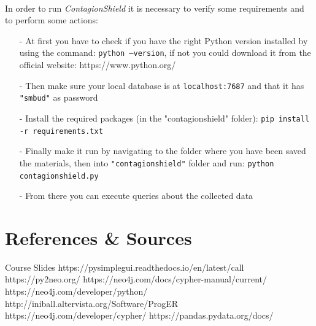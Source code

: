 \documentclass[a4paper,12pt]{article}
\begin{document}
\paragraph{}
In order to run \emph{ContagionShield} it is necessary to verify some requirements and to perform some actions:
\begin{itemize}[noitemsep]
   \item[-] At first you have to check if you have the right Python version installed by using the command: \texttt{python --version}, if not you could download it from the official website: https://www.python.org/ 
   \item[-] Then make sure your local database is at \texttt{localhost:7687} and that it has \texttt{"smbud"} as password
   \item[-] Install the required packages (in the "contagionshield" folder): \texttt{pip install -r requirements.txt}
   \item[-] Finally make it run by navigating to the folder where you have been saved the materials, then into \texttt{"contagionshield"} folder and run: \texttt{python contagionshield.py}
   \item[-] From there you can execute queries about the collected data
\end{itemize}
\newpage
\section{References \& Sources}
  \begin{thebibliography}{9}
    \bibitem{} Course Slides
    \bibitem{} https://pysimplegui.readthedocs.io/en/latest/call%
    \bibitem{} https://py2neo.org/
    \bibitem{} https://neo4j.com/docs/cypher-manual/current/
    \bibitem{} https://neo4j.com/developer/python/
    \bibitem{} http://iniball.altervista.org/Software/ProgER
    \bibitem{} https://neo4j.com/developer/cypher/
    \bibitem{} https://pandas.pydata.org/docs/
  \end{thebibliography}
\end{document}
